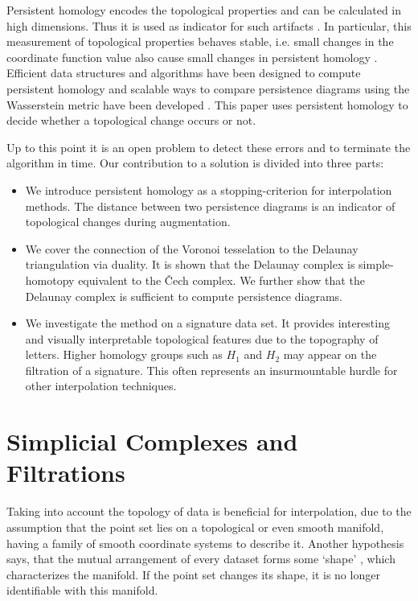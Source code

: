 \documentclass[runningheads]{llncs}
\begin{document}
Persistent homology encodes the topological properties and can be calculated in high dimensions. Thus it is used as indicator for such artifacts \cite{ZomorodianC05}. In particular, this measurement of topological properties behaves stable, i.e. small changes in the coordinate function value also cause small changes in persistent homology \cite{CerriL16}. Efficient data structures and algorithms have been designed to compute persistent homology \cite{ZomorodianC05,Zomorodian10} and scalable ways to compare persistence diagrams using the Wasserstein metric have been developed \cite{CarriereCO17}. This paper uses persistent homology to decide whether a topological change occurs or not.

Up to this point it is an open problem to detect these errors and to terminate the algorithm in time. Our contribution to a solution is divided into three parts:
\begin{itemize}
  \item We introduce persistent homology as a stopping-criterion for interpolation methods. The distance between two persistence diagrams is an indicator of topological changes during augmentation.
  \item We cover the connection of the Voronoi tesselation to the Delaunay triangulation via duality. It is shown that the Delaunay complex is simple-homotopy equivalent to the \v{C}ech complex. We further show that the Delaunay complex is sufficient to compute persistence diagrams.
  \item We investigate the method on a signature data set. It provides interesting and visually interpretable topological features due to the topography of letters. Higher homology groups such as $H_1$ and $H_2$ may appear on the filtration of a signature. This often represents an insurmountable hurdle for other interpolation techniques.
\end{itemize}

\section{Simplicial Complexes and Filtrations}
\label{sec:simplex}
Taking into account the topology of data is beneficial for interpolation, due to the assumption that the point set lies on a topological or even smooth manifold, having a family of smooth coordinate systems to describe it. Another hypothesis says, that the mutual arrangement of every dataset forms some `shape' \cite{ZomorodianC05}, which characterizes the manifold. If the point set changes its shape, it is no longer identifiable with this manifold.
\end{document}
